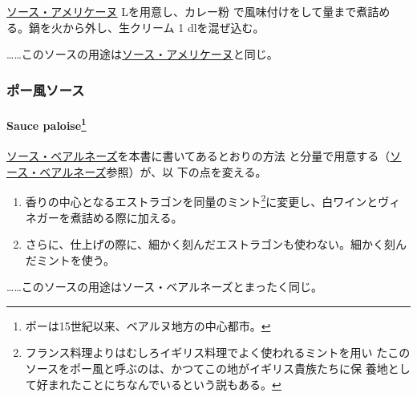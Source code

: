 \begin{recette}
\protect\hyperlink{sauce-americaine}{ソース・アメリケーヌ}\undemi{}
Lを用意し、カレー粉
で風味付けをして\deuxtiers{}量まで煮詰める。鍋を火から外し、生クリーム
1\undemi{} dlを混ぜ込む。

\ldots{}\ldots{}このソースの用途は\protect\hyperlink{sauce-americaine}{ソース・アメリケーヌ}と同じ。

\maeaki

\hypertarget{ux30ddux30fcux98a8ux30bdux30fcux30b9}{%
\subsubsection{ポー風ソース}\label{ux30ddux30fcux98a8ux30bdux30fcux30b9}}

\hypertarget{sauce-paloise110}{%
\paragraph[Sauce paloise]{\texorpdfstring{Sauce paloise\footnote{ポーは15世紀以来、ベアルヌ地方の中心都市。}}{Sauce paloise}}\label{sauce-paloise110}}


\protect\hyperlink{sauce-bearnaise}{ソース・ベアルネーズ}を本書に書いてあるとおりの方法
と分量で用意する（\protect\hyperlink{sauce-bearnaise}{ソース・ベアルネーズ}参照）が、以
下の点を変える。

\begin{enumerate}
\def\labelenumi{\arabic{enumi}.}
\item
  香りの中心となるエストラゴンを同量のミント\footnote{フランス料理よりはむしろイギリス料理でよく使われるミントを用い
    たこのソースをポー風と呼ぶのは、かつてこの地がイギリス貴族たちに保
    養地として好まれたことにちなんでいるという説もある。}に変更し、白ワインとヴィネガーを煮詰める際に加える。
\item
  さらに、仕上げの際に、細かく刻んだエストラゴンも使わない。細かく刻んだミントを使う。
\end{enumerate}

\ldots{}\ldots{}このソースの用途はソース・ベアルネーズとまったく同じ。

\maeaki

\hypertarget{ux30bdux30fcux30b9ux30d7ux30ecux30c3ux30c8109}{%
}
\end{recette}
